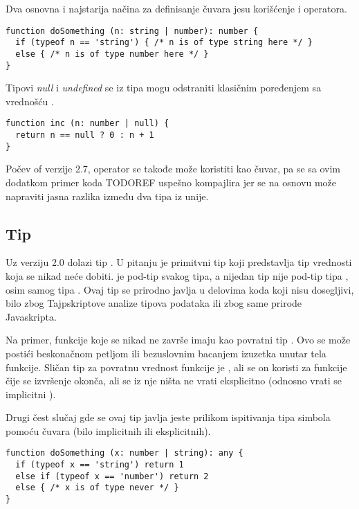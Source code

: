 Dva osnovna i najstarija načina za definisanje čuvara jesu korišćenje  i  operatora.

\begin{verbatim}
function doSomething (n: string | number): number {
  if (typeof n == 'string') { /* n is of type string here */ }
  else { /* n is of type number here */ }
}
\end{verbatim}

Tipovi \textit{null} i \textit{undefined} se iz tipa mogu odstraniti klasičnim poređenjem sa vrednošću .

\begin{verbatim}
function inc (n: number | null) {
  return n == null ? 0 : n + 1
}
\end{verbatim}

Počev of verzije 2.7, operator  se takođe može koristiti kao čuvar, pa se sa ovim dodatkom primer koda TODOREF uspešno kompajlira jer se na osnovu  može napraviti jasna razlika između dva tipa iz unije. 

\subsection{Tip }

Uz verziju 2.0 dolazi tip .
U pitanju je primitvni tip koji predstavlja tip vrednosti koja se nikad neće dobiti.
 je pod-tip svakog tipa, a nijedan tip nije pod-tip tipa , osim samog tipa .
Ovaj tip se prirodno javlja u delovima koda koji nisu dosegljivi, bilo zbog Tajpskriptove analize tipova podataka ili zbog same prirode Javaskripta.

Na primer, funkcije koje se nikad ne završe imaju kao povratni tip .
Ovo se može postići beskonačnom petljom ili bezuslovnim bacanjem izuzetka unutar tela funkcije.
Sličan tip za povratnu vrednost funkcije je , ali se on koristi za funkcije čije se izvršenje okonča, ali se iz nje ništa ne vrati eksplicitno (odnosno vrati se implicitni ).

Drugi čest slučaj gde se ovaj tip javlja jeste prilikom ispitivanja tipa simbola pomoću čuvara (bilo implicitnih ili eksplicitnih).

\begin{verbatim}
function doSomething (x: number | string): any {
  if (typeof x == 'string') return 1
  else if (typeof x == 'number') return 2
  else { /* x is of type never */ }
}
\end{verbatim}

